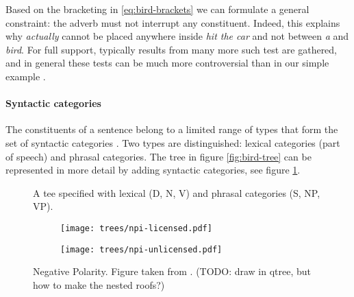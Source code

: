 Based on the bracketing in \ref{eq:bird-brackets} we can formulate a general constraint: the adverb must not interrupt any constituent. Indeed, this explains why \textit{actually} cannot be placed anywhere inside \textit{hit the car} and not between \textit{a} and \textit{bird}. For full support, typically results from many more such test are gathered, and in general these tests can be much more controversial than in our simple example \citep{carnie2010constituent}.

\paragraph{Syntactic categories} The constituents of a sentence belong to a limited range of types that form the set of syntactic categories \citep{huddleston2002grammar}. Two types are distinguished: lexical categories (part of speech) and phrasal categories. The tree in figure \ref{fig:bird-tree} can be represented in more detail by adding syntactic categories, see figure \ref{fig:bird-tree-labeled}.
\begin{figure}[h]{\textwidth}
  \center
  \caption{A tee specified with lexical (D, N, V) and phrasal categories (S, NP, VP).}
  \label{fig:bird-tree-labeled}
\end{figure}

\begin{figure}[b]
  \begin{subfigure}[b]{0.5\textwidth}
		\texttt{[image: trees/npi-licensed.pdf]}
    \label{fig:tree-npi-licensed}
	\end{subfigure}
	\begin{subfigure}[b]{0.5\textwidth}
		\texttt{[image: trees/npi-unlicensed.pdf]}
    \label{fig:tree-npi-unlicensed}
	\end{subfigure}
\caption{Negative Polarity. Figure taken from \cite{everaert2015structures}. (TODO: draw in qtree, but how to make the nested roofs?)}
\label{fig:trees-npi}
\end{figure}

